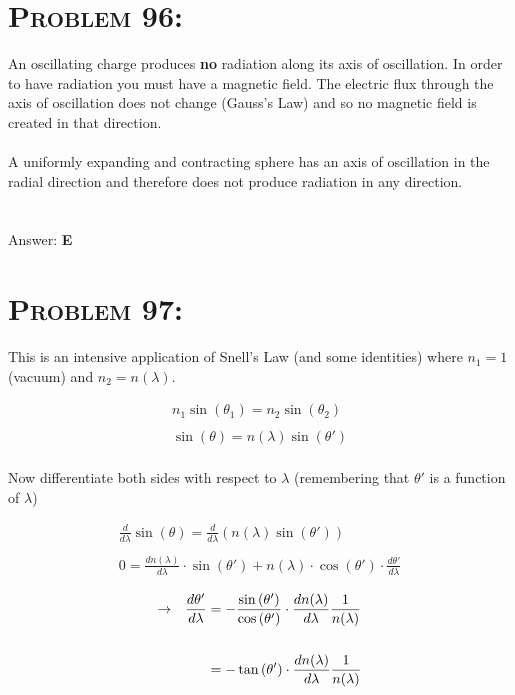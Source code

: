 \documentclass{article}
\begin{document}

\section{\textsc{Problem 96:}} An oscillating charge produces \textbf{no} radiation along its axis of oscillation. In order to have radiation you must have a magnetic field. The electric flux through the axis of oscillation does not change (Gauss's Law) and so no magnetic field is created in that direction. \\
\\
A uniformly expanding and contracting sphere has an axis of oscillation in the radial direction and therefore does not produce radiation in any direction. \\
\\\\
Answer: \textbf{\textcolor{ProcessBlue}E}\\


\section{\textsc{Problem 97:}} This is an intensive application of Snell's Law (and some identities) where $n_{1} = 1$ (vacuum) and $n_{2} = n(\lambda)$.

\begin{gather}
n_{1}\sin{(\theta_{1})} = n_{2}\sin{(\theta_{2})}\\
\nonumber\\
\sin{(\theta)} = n(\lambda) \sin{(\theta')}\nonumber
\end{gather}
\\
Now differentiate both sides with respect to $\lambda$ (remembering that $\theta'$ is a function of $\lambda$)

\begin{gather}
\frac{d}{d\lambda}\sin{(\theta)} = \frac{d}{d\lambda}\left( n(\lambda) \sin{(\theta')} \right)\nonumber \\
\nonumber \\
0 =  \frac{dn(\lambda)} {d\lambda}\cdot  \sin{(\theta')} + n(\lambda) \cdot \cos{(\theta')} \cdot \frac{d\theta'}{d\lambda}\nonumber
\end{gather}

\begin{align}
\rightarrow \hspace{.1in} \frac{d\theta'}{d\lambda} &= -\frac{\sin{(\theta')}}{\cos{(\theta')}} \cdot \frac{d n(\lambda)}{d \lambda} \frac{1}{n(\lambda)}\nonumber\\
\nonumber\\
&= -\tan{(\theta')}\cdot \frac{d n(\lambda)}{d \lambda} \frac{1}{n(\lambda)}\nonumber
\end{align}
\end{document}
